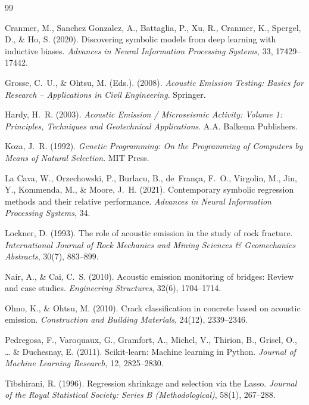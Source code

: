 \documentclass[12pt,a4paper]{article}
\begin{document}

\begin{thebibliography}{99}

Cranmer, M., Sanchez Gonzalez, A., Battaglia, P., Xu, R., Cranmer, K., Spergel,
D., \& Ho, S. (2020). Discovering symbolic models from deep learning with
inductive biases. \textit{Advances in Neural Information Processing Systems},
33, 17429--17442.

Grosse, C.~U., \& Ohtsu, M. (Eds.). (2008). \textit{Acoustic Emission Testing:
Basics for Research -- Applications in Civil Engineering}. Springer.

Hardy, H.~R. (2003). \textit{Acoustic Emission / Microseismic Activity: Volume
1: Principles, Techniques and Geotechnical Applications}. A.A. Balkema
Publishers.

Koza, J.~R. (1992). \textit{Genetic Programming: On the Programming of
Computers by Means of Natural Selection}. MIT Press.

La Cava, W., Orzechowski, P., Burlacu, B., de~Fran\c{c}a, F.~O., Virgolin, M.,
Jin, Y., Kommenda, M., \& Moore, J.~H. (2021). Contemporary symbolic regression
methods and their relative performance. \textit{Advances in Neural Information
Processing Systems}, 34.

Lockner, D. (1993). The role of acoustic emission in the study of rock fracture.
\textit{International Journal of Rock Mechanics and Mining Sciences \&
Geomechanics Abstracts}, 30(7), 883--899.

Nair, A., \& Cai, C.~S. (2010). Acoustic emission monitoring of bridges: Review
and case studies. \textit{Engineering Structures}, 32(6), 1704--1714.

Ohno, K., \& Ohtsu, M. (2010). Crack classification in concrete based on
acoustic emission. \textit{Construction and Building Materials}, 24(12),
2339--2346.

Pedregosa, F., Varoquaux, G., Gramfort, A., Michel, V., Thirion, B., Grisel,
O., \ldots{} \& Duchesnay, E. (2011). Scikit-learn: Machine learning in Python.
\textit{Journal of Machine Learning Research}, 12, 2825--2830.

Tibshirani, R. (1996). Regression shrinkage and selection via the Lasso.
\textit{Journal of the Royal Statistical Society: Series B (Methodological)},
58(1), 267--288.

\end{thebibliography}
\end{document}
